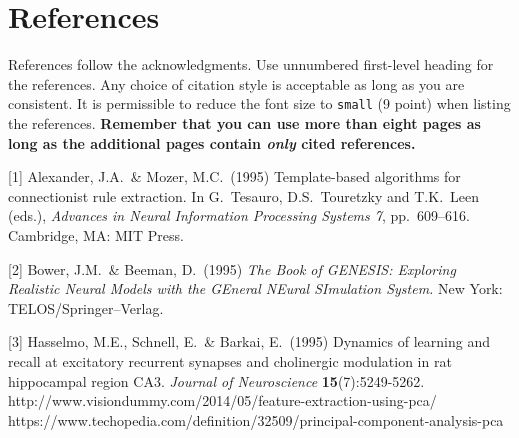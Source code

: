 \documentclass{article}
\begin{document}
\section*{References}

References follow the acknowledgments. Use unnumbered first-level heading for
the references. Any choice of citation style is acceptable as long as you are
consistent. It is permissible to reduce the font size to \verb+small+ (9 point)
when listing the references. {\bf Remember that you can use more than eight
  pages as long as the additional pages contain \emph{only} cited references.}
\medskip

\small

[1] Alexander, J.A.\ \& Mozer, M.C.\ (1995) Template-based algorithms for
connectionist rule extraction. In G.\ Tesauro, D.S.\ Touretzky and T.K.\ Leen
(eds.), {\it Advances in Neural Information Processing Systems 7},
pp.\ 609--616. Cambridge, MA: MIT Press.

[2] Bower, J.M.\ \& Beeman, D.\ (1995) {\it The Book of GENESIS: Exploring
  Realistic Neural Models with the GEneral NEural SImulation System.}  New York:
TELOS/Springer--Verlag.

[3] Hasselmo, M.E., Schnell, E.\ \& Barkai, E.\ (1995) Dynamics of learning and
recall at excitatory recurrent synapses and cholinergic modulation in rat
hippocampal region CA3. {\it Journal of Neuroscience} {\bf 15}(7):5249-5262.
http://www.visiondummy.com/2014/05/feature-extraction-using-pca/
https://www.techopedia.com/definition/32509/principal-component-analysis-pca
\end{document}
